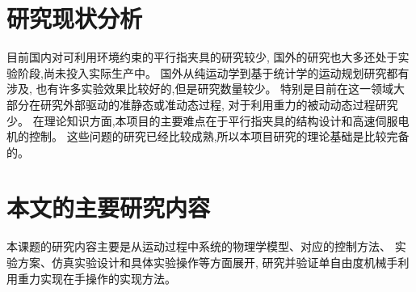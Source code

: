\section{研究现状分析}
目前国内对可利用环境约束的平行指夹具的研究较少,
国外的研究也大多还处于实验阶段,尚未投入实际生产中。
国外从纯运动学到基于统计学的运动规划研究都有涉及,
也有许多实验效果比较好的,但是研究数量较少。
特别是目前在这一领域大部分在研究外部驱动的准静态或准动态过程,
对于利用重力的被动动态过程研究少。
在理论知识方面,本项目的主要难点在于平行指夹具的结构设计和高速伺服电机的控制。
这些问题的研究已经比较成熟,所以本项目研究的理论基础是比较完备的。

\section{本文的主要研究内容}
本课题的研究内容主要是从运动过程中系统的物理学模型、对应的控制方法、
实验方案、仿真实验设计和具体实验操作等方面展开,
研究并验证单自由度机械手利用重力实现在手操作的实现方法。

